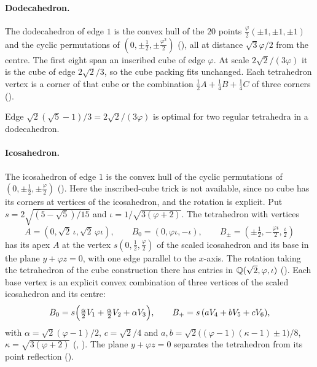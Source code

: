 \documentclass[11pt,a4paper]{article}
\begin{document}
\paragraph{Dodecahedron.} The dodecahedron of edge $1$ is the convex hull of the $20$ points $\tfrac{\varphi}{2}(\pm1,\pm1,\pm1)$ and the cyclic permutations of $(0,\pm\tfrac12,\pm\tfrac{\varphi^2}{2})$ (), all at distance $\sqrt3\varphi/2$ from the centre. The first eight span an inscribed cube of edge $\varphi$. At scale $2\sqrt2/(3\varphi)$ it is the cube of edge $2\sqrt2/3$, so the cube packing fits unchanged. Each tetrahedron vertex is a corner of that cube or the combination $\tfrac12A+\tfrac14B+\tfrac14C$ of three corners ().

\begin{theorem}
Edge $\sqrt2(\sqrt5-1)/3=2\sqrt2/(3\varphi)$ is optimal for two regular tetrahedra in a dodecahedron.
\end{theorem}

\paragraph{Icosahedron.} The icosahedron of edge $1$ is the convex hull of the cyclic permutations of $(0,\pm\tfrac12,\pm\tfrac\varphi2)$ (). Here the inscribed-cube trick is not available, since no cube has its corners at vertices of the icosahedron, and the rotation is explicit. Put $s=2\sqrt{(5-\sqrt5)/15}$ and $\iota=1/\sqrt{3(\varphi+2)}$. The tetrahedron with vertices
\[
A=(0,\sqrt2\,\iota,\sqrt2\,\varphi\iota),\qquad B_0=(0,\varphi\iota,-\iota),\qquad B_\pm=(\pm\tfrac12,-\tfrac{\varphi\iota}{2},\tfrac{\iota}{2})
\]
has its apex $A$ at the vertex $s(0,\tfrac12,\tfrac\varphi2)$ of the scaled icosahedron and its base in the plane $y+\varphi z=0$, with one edge parallel to the $x$-axis. The rotation taking the tetrahedron of the cube construction there has entries in $\mathbb Q(\sqrt2,\varphi,\iota)$ (). Each base vertex is an explicit convex combination of three vertices of the scaled icosahedron and its centre:
\[
B_0=s\Bigl(\tfrac\alpha2V_1+\tfrac\alpha2V_2+\alpha V_3\Bigr),\qquad B_+=s\,(aV_4+bV_5+cV_6),
\]
with $\alpha=\sqrt2(\varphi-1)/2$, $c=\sqrt2/4$ and $a,b=\sqrt2\bigl((\varphi-1)(\kappa-1)\pm1\bigr)/8$, $\kappa=\sqrt{3(\varphi+2)}$ (, ). The plane $y+\varphi z=0$ separates the tetrahedron from its point reflection ().
\end{document}
